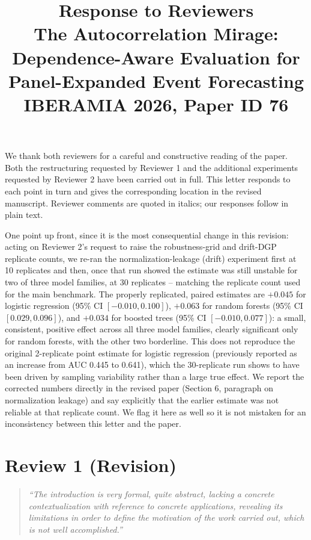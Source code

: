 \documentclass[11pt]{article}
\title{Response to Reviewers\\
\large The Autocorrelation Mirage: Dependence-Aware Evaluation for Panel-Expanded Event Forecasting\\
\normalsize IBERAMIA 2026, Paper ID 76}
\author{}
\date{}
\newcommand{\rc}[1]{\textit{``#1''}}
\newenvironment{response}{\begin{quote}\color{black}}{\end{quote}}
\begin{document}
\maketitle

We thank both reviewers for a careful and constructive reading of the paper. Both the restructuring requested by Reviewer 1 and the additional experiments requested by Reviewer 2 have been carried out in full. This letter responds to each point in turn and gives the corresponding location in the revised manuscript. Reviewer comments are quoted in italics; our responses follow in plain text.

One point up front, since it is the most consequential change in this revision: acting on Reviewer 2's request to raise the robustness-grid and drift-DGP replicate counts, we re-ran the normalization-leakage (drift) experiment first at 10 replicates and then, once that run showed the estimate was still unstable for two of three model families, at 30 replicates -- matching the replicate count used for the main benchmark. The properly replicated, paired estimates are $+0.045$ for logistic regression (95\% CI $[-0.010, 0.100]$), $+0.063$ for random forests (95\% CI $[0.029, 0.096]$), and $+0.034$ for boosted trees (95\% CI $[-0.010, 0.077]$): a small, consistent, positive effect across all three model families, clearly significant only for random forests, with the other two borderline. This does not reproduce the original 2-replicate point estimate for logistic regression (previously reported as an increase from AUC 0.445 to 0.641), which the 30-replicate run shows to have been driven by sampling variability rather than a large true effect. We report the corrected numbers directly in the revised paper (Section 6, paragraph on normalization leakage) and say explicitly that the earlier estimate was not reliable at that replicate count. We flag it here as well so it is not mistaken for an inconsistency between this letter and the paper.

\section*{Review 1 (Revision)}

\begin{response}
\rc{The introduction is very formal, quite abstract, lacking a concrete contextualization with reference to concrete applications, revealing its limitations in order to define the motivation of the work carried out, which is not well accomplished.}
\end{response}
\end{document}
